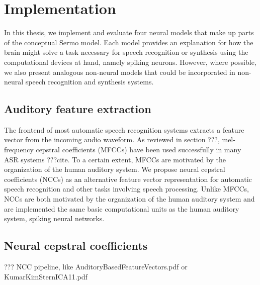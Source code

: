 \chapter{Implementation}

In this thesis, we implement and evaluate
four neural models that make up
parts of the conceptual Sermo model.
Each model provides
an explanation for how the brain might
solve a task necessary for
speech recognition or synthesis
using the computational devices at hand,
namely spiking neurons.
However, where possible,
we also present analogous non-neural models
that could be incorporated in
non-neural speech recognition and synthesis systems.

\section{Auditory feature extraction}


The frontend of most automatic speech recognition systems
extracts a feature vector from the incoming audio waveform.
As reviewed in section ???,
mel-frequency cepstral coefficients (MFCCs)
have been used successfully in many ASR systems ???cite.
To a certain extent, MFCCs are motivated
by the organization of the human auditory system.
We propose neural cepstral coefficients (NCCs)
as an alternative feature vector representation
for automatic speech recognition
and other tasks involving speech processing.
Unlike MFCCs, NCCs are both motivated
by the organization of the human auditory system
and are implemented the same basic computational units
as the human auditory system,
spiking neural networks.

\section{Neural cepstral coefficients}

??? NCC pipeline, like AuditoryBasedFeatureVectors.pdf
or KumarKimSternICA11.pdf

